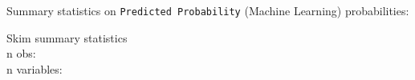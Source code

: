 \documentclass[]{article}
\newenvironment{Shaded}{\begin{snugshade}}{\end{snugshade}}
\newcommand{\DataTypeTok}[1]{\textcolor[rgb]{0.13,0.29,0.53}{#1}}
\newcommand{\KeywordTok}[1]{\textcolor[rgb]{0.13,0.29,0.53}{\textbf{#1}}}
\newcommand{\NormalTok}[1]{#1}
\newcommand{\OperatorTok}[1]{\textcolor[rgb]{0.81,0.36,0.00}{\textbf{#1}}}
\newcommand{\StringTok}[1]{\textcolor[rgb]{0.31,0.60,0.02}{#1}}
\begin{document}
\begin{Shaded}
\end{Shaded}

Summary statistics on \texttt{Predicted\ Probability} (Machine Learning)
probabilities:

\begin{Shaded}
\end{Shaded}

Skim summary statistics\\
n obs:\\
n variables:
\end{document}
